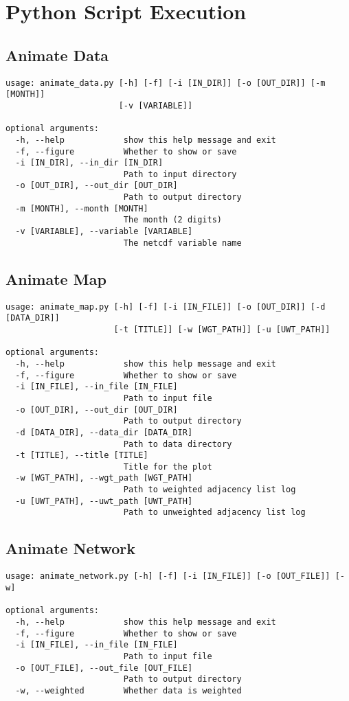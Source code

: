 \section{Python Script Execution}
\label{sec:orgdfb4f1e}
\subsection{Animate Data}
\label{sec:org06de043}
\begin{verbatim}
usage: animate_data.py [-h] [-f] [-i [IN_DIR]] [-o [OUT_DIR]] [-m [MONTH]]
                       [-v [VARIABLE]]

optional arguments:
  -h, --help            show this help message and exit
  -f, --figure          Whether to show or save
  -i [IN_DIR], --in_dir [IN_DIR]
                        Path to input directory
  -o [OUT_DIR], --out_dir [OUT_DIR]
                        Path to output directory
  -m [MONTH], --month [MONTH]
                        The month (2 digits)
  -v [VARIABLE], --variable [VARIABLE]
                        The netcdf variable name
\end{verbatim}

\subsection{Animate Map}
\label{sec:org143feb5}
\begin{verbatim}
usage: animate_map.py [-h] [-f] [-i [IN_FILE]] [-o [OUT_DIR]] [-d [DATA_DIR]]
                      [-t [TITLE]] [-w [WGT_PATH]] [-u [UWT_PATH]]

optional arguments:
  -h, --help            show this help message and exit
  -f, --figure          Whether to show or save
  -i [IN_FILE], --in_file [IN_FILE]
                        Path to input file
  -o [OUT_DIR], --out_dir [OUT_DIR]
                        Path to output directory
  -d [DATA_DIR], --data_dir [DATA_DIR]
                        Path to data directory
  -t [TITLE], --title [TITLE]
                        Title for the plot
  -w [WGT_PATH], --wgt_path [WGT_PATH]
                        Path to weighted adjacency list log
  -u [UWT_PATH], --uwt_path [UWT_PATH]
                        Path to unweighted adjacency list log
\end{verbatim}

\subsection{Animate Network}
\label{sec:orga73a9d6}
\begin{verbatim}
usage: animate_network.py [-h] [-f] [-i [IN_FILE]] [-o [OUT_FILE]] [-w]

optional arguments:
  -h, --help            show this help message and exit
  -f, --figure          Whether to show or save
  -i [IN_FILE], --in_file [IN_FILE]
                        Path to input file
  -o [OUT_FILE], --out_file [OUT_FILE]
                        Path to output directory
  -w, --weighted        Whether data is weighted
\end{verbatim}

